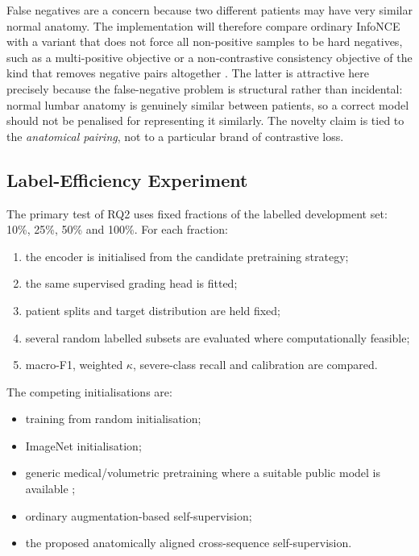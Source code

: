 False negatives are a concern because two different patients may have very
similar normal anatomy. The implementation will therefore compare ordinary
InfoNCE with a variant that does not force all non-positive samples to be hard
negatives, such as a multi-positive objective or a non-contrastive consistency
objective of the kind that removes negative pairs altogether
\cite{grill2020bootstrap}. The latter is attractive here precisely because the
false-negative problem is structural rather than incidental: normal lumbar
anatomy is genuinely similar between patients, so a correct model should not be
penalised for representing it similarly.
The novelty claim is tied to the \emph{anatomical pairing}, not to a particular
brand of contrastive loss.

\subsection{Label-Efficiency Experiment}
\label{sec:method-label-efficiency}

The primary test of RQ2 uses fixed fractions of the labelled development set:
10\%, 25\%, 50\% and 100\%. For each fraction:

\begin{enumerate}
  \item the encoder is initialised from the candidate pretraining strategy;
  \item the same supervised grading head is fitted;
  \item patient splits and target distribution are held fixed;
  \item several random labelled subsets are evaluated where computationally
        feasible;
  \item macro-F1, weighted $\kappa$, severe-class recall and calibration are
        compared.
\end{enumerate}

The competing initialisations are:

\begin{itemize}
  \item training from random initialisation;
  \item ImageNet initialisation;
  \item generic medical/volumetric pretraining where a suitable public model is
        available \cite{azizi2021big};
  \item ordinary augmentation-based self-supervision;
  \item the proposed anatomically aligned cross-sequence self-supervision.
\end{itemize}

